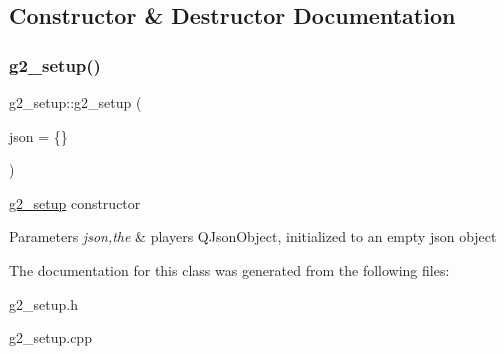\subsection{Constructor \& Destructor Documentation}
\mbox{\label{classg2__setup_a1f4d4c1317565eb2bd9de3e2aa75f0a8}} 
\subsubsection{\texorpdfstring{g2\+\_\+setup()}{g2\_setup()}}
{\footnotesize\ttfamily g2\+\_\+setup\+::g2\+\_\+setup (\begin{DoxyParamCaption}\item[{Q\+Json\+Object}]{json = {\ttfamily \{\}} }\end{DoxyParamCaption})\hspace{0.3cm}{\ttfamily [explicit]}}



\hyperlink{classg2__setup}{g2\+\_\+setup} constructor 


\begin{DoxyParams}{Parameters}
{\em json,the} & player\textquotesingle{}s Q\+Json\+Object, initialized to an empty json object \\
\hline
\end{DoxyParams}


The documentation for this class was generated from the following files\+:\begin{DoxyCompactItemize}
\item 
g2\+\_\+setup.\+h\item 
g2\+\_\+setup.\+cpp\end{DoxyCompactItemize}
